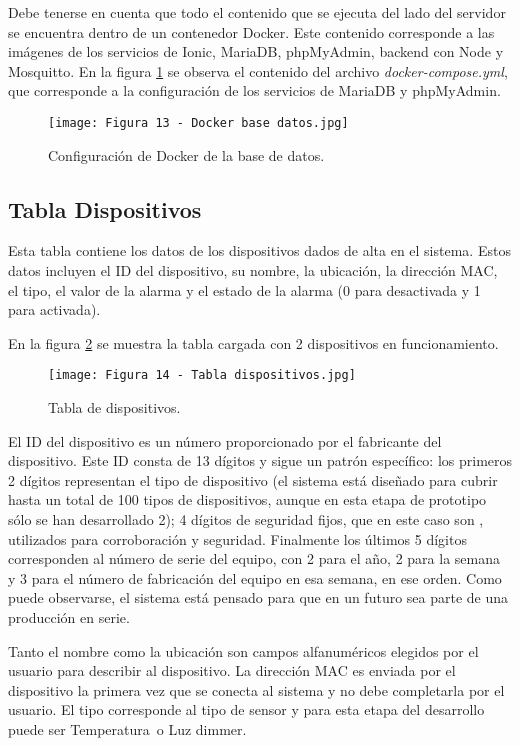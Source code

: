 Debe tenerse en cuenta que todo el contenido que se ejecuta del lado del servidor se encuentra dentro de un contenedor Docker. Este contenido corresponde a las imágenes de los servicios de Ionic, MariaDB, phpMyAdmin, backend con Node y Mosquitto. En la figura \ref{fig:13} se observa el contenido del archivo \textit{docker-compose.yml}, que corresponde a la configuración de los servicios de MariaDB y phpMyAdmin.

\begin{figure}[h]
\centering
\texttt{[image: Figura 13 - Docker base datos.jpg]}
\caption[Docker base datos]{Configuración de Docker de la base de datos. \footnotemark}
\label{fig:13}
\end{figure}

\subsection{Tabla Dispositivos}

Esta tabla contiene los datos de los dispositivos dados de alta en el sistema. Estos datos incluyen el ID del dispositivo, su nombre, la ubicación, la dirección MAC, el tipo, el valor de la alarma y el estado de la alarma (0 para desactivada y 1 para activada).

En la figura \ref{fig:14} se muestra la tabla cargada con 2 dispositivos en funcionamiento.

\begin{figure}[h]
\centering
\texttt{[image: Figura 14 - Tabla dispositivos.jpg]}
\caption[Tabla dispositivos]{Tabla de dispositivos. \footnotemark}
\label{fig:14}
\end{figure}

El ID del dispositivo es un número proporcionado por el fabricante del dispositivo. Este ID consta de 13 dígitos y sigue un patrón específico: los primeros 2 dígitos representan el tipo de dispositivo (el sistema está diseñado para cubrir hasta un total de 100 tipos de dispositivos, aunque en esta etapa de prototipo sólo se han desarrollado 2); 4 dígitos de seguridad fijos, que en este caso son \textquotedbl , utilizados para corroboración y seguridad. Finalmente los últimos 5 dígitos corresponden al número de serie del equipo, con 2 para el año, 2 para la semana y 3 para el número de fabricación del equipo en esa semana, en ese orden. Como puede observarse, el sistema está pensado para que en un futuro sea parte de una producción en serie.

Tanto el nombre como la ubicación son campos alfanuméricos elegidos por el usuario para describir al dispositivo. La dirección MAC es enviada por el dispositivo la primera vez que se conecta al sistema y no debe completarla por el usuario. El tipo corresponde al tipo de sensor y para esta etapa del desarrollo puede ser \textquotedbl Temperatura\textquotedbl\ o \textquotedbl Luz dimmer\textquotedbl.

